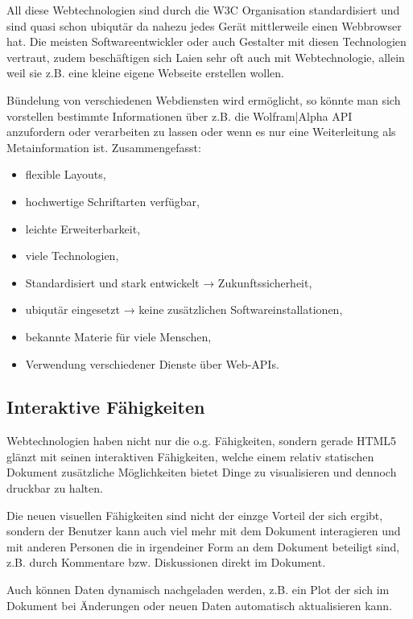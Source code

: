 All diese Webtechnologien sind durch die W3C Organisation standardisiert
und sind quasi schon ubiqutär da nahezu jedes Gerät mittlerweile einen
Webbrowser hat.
Die meisten Softwareentwickler oder auch
Gestalter mit diesen Technologien vertraut, zudem beschäftigen sich
Laien sehr oft auch mit Webtechnologie, allein weil sie z.B. eine kleine
eigene Webseite erstellen wollen.

Bündelung von verschiedenen Webdiensten wird ermöglicht, so könnte man sich
vorstellen bestimmte Informationen über z.B. die Wolfram|Alpha API
anzufordern oder verarbeiten zu lassen oder wenn es nur eine Weiterleitung
als Metainformation ist.
Zusammengefasst:

\begin{itemize}
  \item flexible Layouts,
  \item hochwertige Schriftarten verfügbar,
  \item leichte Erweiterbarkeit,
  \item viele Technologien,
  \item Standardisiert und stark entwickelt → Zukunftssicherheit,
  \item ubiqutär eingesetzt → keine zusätzlichen Softwareinstallationen,
  \item bekannte Materie für viele Menschen,
  \item Verwendung verschiedener Dienste über Web-APIs.
\end{itemize}

\subsection{Interaktive Fähigkeiten}

Webtechnologien haben nicht nur die o.g. Fähigkeiten, sondern gerade
HTML5 glänzt mit seinen interaktiven Fähigkeiten, welche einem relativ
statischen Dokument zusätzliche Möglichkeiten bietet Dinge zu
visualisieren und dennoch druckbar zu halten.

Die neuen visuellen Fähigkeiten sind nicht der einzge Vorteil der sich ergibt,
sondern der Benutzer kann auch viel mehr mit dem Dokument interagieren
und mit anderen Personen die in irgendeiner Form an dem Dokument beteiligt
sind, z.B. durch Kommentare bzw. Diskussionen direkt im Dokument.

Auch können Daten dynamisch nachgeladen werden, z.B. ein Plot der sich
im Dokument bei Änderungen oder neuen Daten automatisch aktualisieren kann.


